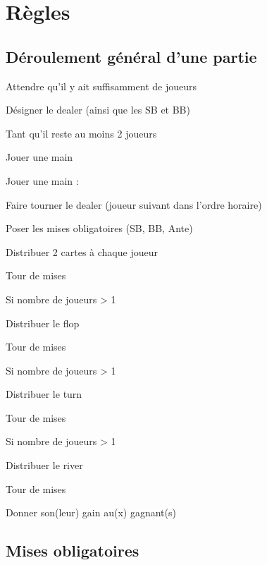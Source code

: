 
\section{Règles}

\subsection{Déroulement général d'une partie}

Attendre qu'il y ait suffisamment de joueurs

Désigner le dealer (ainsi que les SB et BB)

Tant qu'il reste au moins 2 joueurs

\hspace{1cm}Jouer une main

\vspace{5mm}
Jouer une main :

Faire tourner le dealer (joueur suivant dans l'ordre horaire)

Poser les mises obligatoires (SB, BB, Ante)

Distribuer 2 cartes à chaque joueur

Tour de mises

Si nombre de joueurs > 1

\hspace{1cm}Distribuer le flop

\hspace{1cm}Tour de mises

\hspace{1cm}Si nombre de joueurs > 1

\hspace{2cm}Distribuer le turn

\hspace{2cm}Tour de mises

\hspace{2cm}Si nombre de joueurs > 1

\hspace{3cm}Distribuer le river

\hspace{3cm}Tour de mises

Donner son(leur) gain au(x) gagnant(s)

\subsection{Mises obligatoires}

